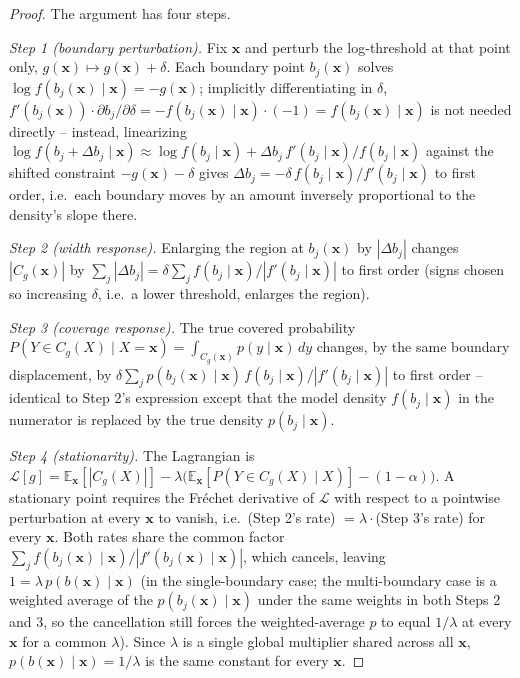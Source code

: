 \documentclass[10pt,twocolumn,a4paper]{article}
\begin{document}
\begin{proof}
The argument has four steps.

\emph{Step 1 (boundary perturbation).} Fix $\bm x$ and perturb the log-threshold at that point only,
$g(\bm x)\mapsto g(\bm x)+\delta$. Each boundary point $b_j(\bm x)$ solves
$\log f(b_j(\bm x)\mid\bm x)=-g(\bm x)$; implicitly differentiating in $\delta$,
$f'(b_j(\bm x))\cdot \partial b_j/\partial\delta = -f(b_j(\bm x)\mid\bm x)\cdot(-1) = f(b_j(\bm x)\mid \bm x)$
is not needed directly -- instead, linearizing $\log f(b_j+\Delta b_j\mid\bm x)\approx \log f(b_j\mid\bm x) + \Delta b_j\, f'(b_j\mid\bm x)/f(b_j\mid\bm x)$
against the shifted constraint $-g(\bm x)-\delta$ gives $\Delta b_j = -\delta\, f(b_j\mid\bm x)/f'(b_j\mid\bm x)$
to first order, i.e.\ each boundary moves by an amount inversely proportional to the density's slope
there.

\emph{Step 2 (width response).} Enlarging the region at $b_j(\bm x)$ by $|\Delta b_j|$ changes
$|C_g(\bm x)|$ by $\sum_j |\Delta b_j| = \delta\sum_j f(b_j\mid\bm x)/|f'(b_j\mid\bm x)|$ to first
order (signs chosen so increasing $\delta$, i.e.\ a lower threshold, enlarges the region).

\emph{Step 3 (coverage response).} The true covered probability
$P(Y\in C_g(X)\mid X=\bm x)=\int_{C_g(\bm x)}p(y\mid\bm x)\,dy$ changes, by the same boundary
displacement, by $\delta\sum_j p(b_j(\bm x)\mid\bm x)\,f(b_j\mid\bm x)/|f'(b_j\mid\bm x)|$ to first
order -- identical to Step 2's expression except that the model density $f(b_j\mid\bm x)$ in the
numerator is replaced by the true density $p(b_j\mid\bm x)$.

\emph{Step 4 (stationarity).} The Lagrangian is
$\mathcal L[g]=\mathbb E_{\bm x}[|C_g(X)|]-\lambda\big(\mathbb E_{\bm x}[P(Y\in C_g(X)\mid X)]-(1-\alpha)\big)$.
A stationary point requires the Fr\'echet derivative of $\mathcal L$ with respect to a pointwise
perturbation at every $\bm x$ to vanish, i.e.\ (Step 2's rate) $=\lambda\cdot$(Step 3's rate) for
every $\bm x$. Both rates share the common factor $\sum_j f(b_j(\bm x)\mid\bm x)/|f'(b_j(\bm x)\mid\bm x)|$,
which cancels, leaving $1=\lambda\,p(b(\bm x)\mid\bm x)$ (in the single-boundary case; the
multi-boundary case is a weighted average of the $p(b_j(\bm x)\mid\bm x)$ under the same weights in
both Steps 2 and 3, so the cancellation still forces the weighted-average $p$ to equal $1/\lambda$
at every $\bm x$ for a common $\lambda$). Since $\lambda$ is a single global multiplier shared across
all $\bm x$, $p(b(\bm x)\mid\bm x)=1/\lambda$ is the same constant for every $\bm x$.
\end{proof}
\end{document}
